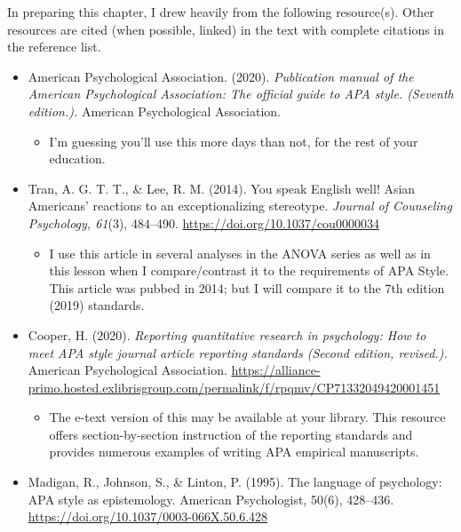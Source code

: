 \documentclass[
  english,
]{book}
\providecommand{\tightlist}{%
  \setlength{\itemsep}{0pt}\setlength{\parskip}{0pt}}
\begin{document}
In preparing this chapter, I drew heavily from the following resource(s). Other resources are cited (when possible, linked) in the text with complete citations in the reference list.

\begin{itemize}
\tightlist
\item
  American Psychological Association. (2020). \emph{Publication manual of the American Psychological Association: The official guide to APA style. (Seventh edition.).} American Psychological Association.

  \begin{itemize}
  \tightlist
  \item
    I'm guessing you'll use this more days than not, for the rest of your education.
  \end{itemize}
\item
  Tran, A. G. T. T., \& Lee, R. M. (2014). You speak English well! Asian Americans' reactions to an exceptionalizing stereotype. \emph{Journal of Counseling Psychology, 61}(3), 484--490. \url{https://doi.org/10.1037/cou0000034}

  \begin{itemize}
  \tightlist
  \item
    I use this article in several analyses in the ANOVA series as well as in this lesson when I compare/contrast it to the requirements of APA Style. This article was pubbed in 2014; but I will compare it to the 7th edition (2019) standards.
  \end{itemize}
\item
  Cooper, H. (2020). \emph{Reporting quantitative research in psychology: How to meet APA style journal article reporting standards (Second edition, revised.).} American Psychological Association. \url{https://alliance-primo.hosted.exlibrisgroup.com/permalink/f/rpqmv/CP71332049420001451}

  \begin{itemize}
  \tightlist
  \item
    The e-text version of this may be available at your library. This resource offers section-by-section instruction of the reporting standards and provides numerous examples of writing APA empirical manuscripts.
  \end{itemize}
\item
  Madigan, R., Johnson, S., \& Linton, P. (1995). The language of psychology: APA style as epistemology. American Psychologist, 50(6), 428--436. \url{https://doi.org/10.1037/0003-066X.50.6.428}


\end{itemize}
\end{document}
